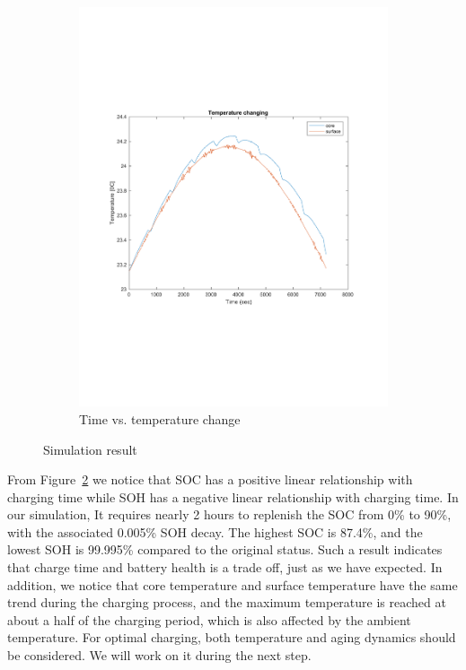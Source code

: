 \documentclass[10pt]{article}
\begin{document}
\begin{figure}[H]
\begin{subfigure}[t]{0.36\textwidth}
		\includegraphics[width=\textwidth]{tempchange.pdf}
		\caption{Time vs. temperature change}
		\label{fig:tempChange}
	\end{subfigure}
	\vspace{-0.25cm}
	\caption{Simulation result}\label{fig:sim}
\end{figure}
\noindent From Figure~\ref{fig:sim} we notice that SOC has a positive linear relationship with charging time while SOH has a negative linear relationship with charging time. In our simulation, It requires nearly 2 hours to replenish the SOC from 0\% to 90\%, with the associated 0.005\% SOH decay. The highest SOC is 87.4\%, and the lowest SOH is 99.995\% compared to the original status. Such a result indicates that charge time and battery health is a trade off, just as we have expected. In addition, we notice that core temperature and surface temperature have the same trend during the charging process, and the maximum temperature is reached at about a half of the charging period, which is also affected by the ambient temperature. For optimal charging, both temperature and aging dynamics should be considered. We will work on it during the next step.
\end{document}
